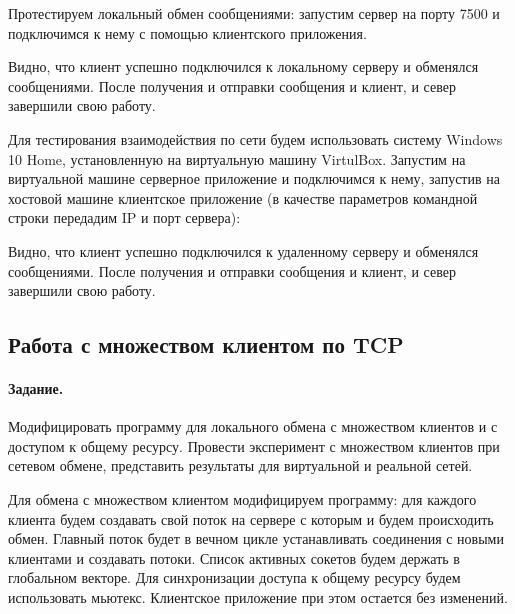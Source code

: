 



Протестируем локальный обмен сообщениями: запустим сервер на порту 7500 и подключимся к нему с помощью клиентского приложения.





Видно, что клиент успешно подключился к локальному серверу и обменялся сообщениями. После получения и отправки сообщения  и клиент, и север завершили свою работу.

Для тестирования взаимодействия по сети будем использовать систему Windows 10 Home, установленную на виртуальную машину VirtulBox. Запустим на виртуальной машине серверное приложение и подключимся к нему, запустив на хостовой машине клиентское приложение (в качестве параметров командной строки передадим IP и порт сервера):





Видно, что клиент успешно подключился к удаленному серверу и обменялся сообщениями. После получения и отправки сообщения  и клиент, и север завершили свою работу.

\subsection{Работа с множеством клиентом по TCP}

\paragraph{Задание.} Модифицировать программу для локального обмена с множеством клиентов и с доступом к общему ресурсу. Провести эксперимент с множеством клиентов при сетевом обмене, представить результаты для виртуальной и реальной сетей.

Для обмена с множеством клиентом модифицируем программу: для каждого клиента будем создавать свой поток на сервере с которым и будем происходить обмен. Главный поток будет в вечном цикле устанавливать соединения с новыми клиентами и создавать потоки. Список активных сокетов будем держать в глобальном векторе. Для синхронизации доступа к общему ресурсу будем использовать мьютекс. Клиентское приложение при этом остается без изменений.

